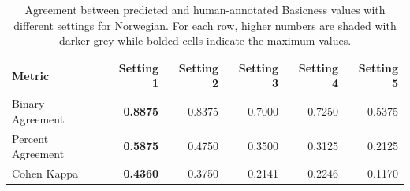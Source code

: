 \documentclass[preprint,12pt,authoryear]{elsarticle}
\begin{document}
\begin{table}[ht]
\centering
\caption{Agreement between predicted and human-annotated Basicness values with different settings for Norwegian. For each row, higher numbers are shaded with darker grey while bolded cells indicate the maximum values.}
\label{tab:agreement_scores_comparison_nb}
\begin{tabular}{@{}l r r r r r@{}}
\toprule
\textbf{Metric} & \textbf{Setting 1} & \textbf{Setting 2} & \textbf{Setting 3} & \textbf{Setting 4} & \textbf{Setting 5} \\ 
\midrule
Binary Agreement     & \cellcolor{gray!90} \textbf{0.8875} & \cellcolor{gray!82} 0.8375 & \cellcolor{gray!57} 0.7000 & \cellcolor{gray!61} 0.7250 & \cellcolor{gray!36} 0.5375 \\
Percent Agreement    & \cellcolor{gray!67} \textbf{0.5875} & \cellcolor{gray!54} 0.4750 & \cellcolor{gray!40} 0.3500 & \cellcolor{gray!36} 0.3125 & \cellcolor{gray!25} 0.2125 \\
Cohen Kappa          & \cellcolor{gray!49} \textbf{0.4360} & \cellcolor{gray!43} 0.3750 & \cellcolor{gray!25} 0.2141 & \cellcolor{gray!27} 0.2246 & \cellcolor{gray!15} 0.1170 \\
\bottomrule
\end{tabular}
\smallskip
\end{table}




\end{document}
